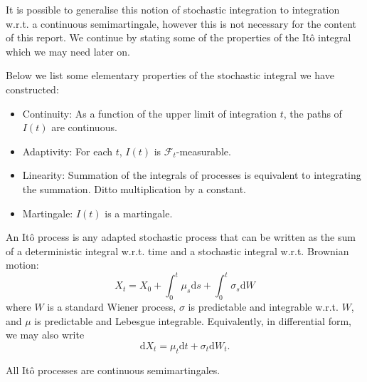 It is possible to generalise this notion of stochastic integration to integration 
w.r.t. a continuous semimartingale, however this is not necessary for the content of 
this report. We continue by stating some of the properties of the It\^{o} integral
which we may need later on.

\begin{remark}
    Below we list some elementary properties of the stochastic integral we have
    constructed:
    \begin{itemize}
        \item Continuity: As a function of the upper limit of integration $t$, the 
        paths of $I(t)$ are continuous.
        \item Adaptivity: For each $t$, $I(t)$ is $\mathcal{F}_t$-measurable.
        \item Linearity: Summation of the integrals of processes is equivalent to
        integrating the summation. Ditto multiplication by a constant.
        \item Martingale: $I(t)$ is a martingale.
    \end{itemize}
\end{remark}

\begin{definition}[It\^{o} Processes]
    An It\^{o} process is any adapted stochastic process that can be written as the sum of a 
    deterministic integral w.r.t. time and a stochastic integral w.r.t. Brownian motion:
    \begin{equation}
        X_t=X_0+\int_0^t\mu_s\mathrm ds+\int_0^t\sigma_s\mathrm dW
    \end{equation}
    where $W$ is a standard Wiener process, $\sigma$ is predictable and integrable w.r.t. $W$,
    and $\mu$ is predictable and Lebesgue integrable. Equivalently, in differential form, we 
    may also write
    \begin{equation}
        \mathrm dX_t=\mu_t\mathrm dt + \sigma_t\mathrm dW_t.
    \end{equation}
\end{definition}

\begin{remark}
    All It\^{o} processes are continuous semimartingales.
\end{remark}

